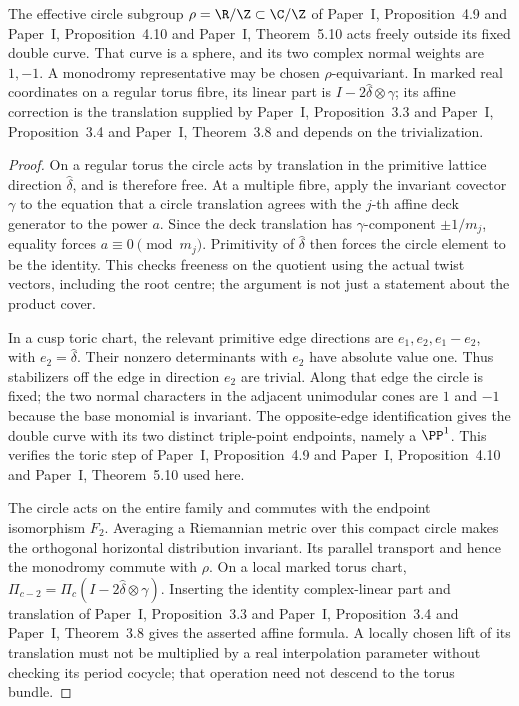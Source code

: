 \begin{proposition}\label{push:src:C.3.1}
The effective circle subgroup $\rho=\R/\Z\subset\C/\Z$ of Paper~I, Proposition~4.9 and Paper~I, Proposition~4.10 and Paper~I, Theorem~5.10
acts freely outside its fixed double curve. That curve is a sphere,
and its two complex normal weights are $1,-1$. A monodromy
representative may be chosen $\rho$-equivariant. In marked real
coordinates on a regular torus fibre, its linear part is
$I-2\widehat\delta\otimes\gamma$; its affine correction is the
translation supplied by Paper~I, Proposition~3.3 and Paper~I, Proposition~3.4 and Paper~I, Theorem~3.8 and depends on the trivialization.
\end{proposition}

\begin{proof}
On a regular torus the circle acts by translation in the primitive
lattice direction $\widehat\delta$, and is therefore free.
At a multiple fibre, apply the invariant covector $\gamma$ to the
equation that a circle translation agrees with the $j$-th affine
deck generator to the power $a$. Since the deck translation has
$\gamma$-component $\pm1/m_j$, equality forces
$a\equiv0\pmod{m_j}$. Primitivity of $\widehat\delta$ then
forces the circle element to be the identity. This checks freeness
on the quotient using the actual twist vectors, including the root
centre; the argument is not just a statement about the product cover.

In a cusp toric chart, the relevant primitive edge directions are
$e_1,e_2,e_1-e_2$, with $e_2=\widehat\delta$.
Their nonzero determinants with $e_2$ have absolute value one.
Thus stabilizers off the edge in direction $e_2$ are trivial. Along
that edge the circle is fixed; the two normal characters in the
adjacent unimodular cones are $1$ and $-1$ because the base monomial
is invariant. The opposite-edge identification gives the double
curve with its two distinct triple-point endpoints, namely a
$\PP^1$. This verifies the toric step of Paper~I, Proposition~4.9 and Paper~I, Proposition~4.10 and Paper~I, Theorem~5.10 used here.

The circle acts on the entire family and commutes with the endpoint
isomorphism $F_2$. Averaging a Riemannian metric over this compact
circle makes the orthogonal horizontal distribution invariant.
Its parallel transport and hence the monodromy commute with $\rho$.
On a local marked torus chart,
$\Pi_{c-2}=\Pi_c(I-2\widehat\delta\otimes\gamma)$.
Inserting the identity complex-linear part and translation of Paper~I, Proposition~3.3 and Paper~I, Proposition~3.4 and Paper~I, Theorem~3.8
gives the asserted affine formula. A locally chosen lift of its
translation must not be multiplied by a real interpolation parameter
without checking its period cocycle; that operation need not descend
to the torus bundle.
\end{proof}

